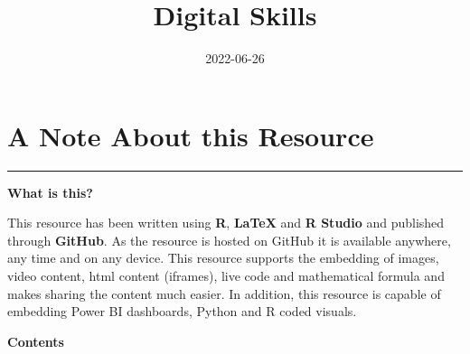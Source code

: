 \documentclass[
]{book}
\title{Digital Skills}
\author{}
\date{\vspace{-2.5em}2022-06-26}
\begin{document}
\maketitle

{
\setcounter{tocdepth}{1}
\tableofcontents
}
\hypertarget{A-Note-About-this-Resource}{%
\chapter*{A Note About this Resource}\label{A-Note-About-this-Resource}}

\begin{center}\rule{0.5\linewidth}{0.5pt}\end{center}

\textbf{What is this?}

This resource has been written using \textbf{R}, \textbf{LaTeX} and \textbf{R Studio} and published through \textbf{GitHub}. As the resource is hosted on GitHub it is available anywhere, any time and on any device. This resource supports the embedding of images, video content, html content (iframes), live code and mathematical formula and makes sharing the content much easier. In addition, this resource is capable of embedding Power BI dashboards, Python and R coded visuals.

\textbf{Contents}
\end{document}
